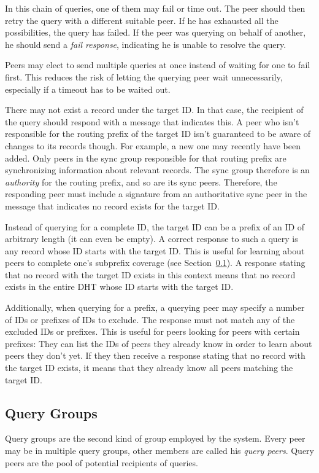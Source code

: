 In this chain of queries, one of them may fail or time out. The peer should then
retry the query with a different suitable peer. If he has exhausted all the
possibilities, the query has failed. If the peer was querying on behalf of
another, he should send a \emph{fail response}, indicating he is unable to
resolve the query.

Peers may elect to send multiple queries at once instead of waiting for one to
fail first. This reduces the risk of letting the querying peer wait
unnecessarily, especially if a timeout has to be waited out.

There may not exist a record under the target ID. In that case, the recipient of
the query should respond with a message that indicates this. A peer who isn't
responsible for the routing prefix of the target ID isn't guaranteed to be aware
of changes to its records though. For example, a new one may recently have been
added. Only peers in the sync group responsible for that routing prefix are
synchronizing information about relevant records. The sync group therefore is an
\emph{authority} for the routing prefix, and so are its sync peers. Therefore,
the responding peer must include a signature from an authoritative sync peer in
the message that indicates no record exists for the target ID.

Instead of querying for a complete ID, the target ID can be a prefix of an ID of
arbitrary length (it can even be empty). A correct response to such a query is
any record whose ID starts with the target ID. This is useful for learning about
peers to complete one's subprefix coverage (see
Section~\ref{sec:desc_query_groups}). A response stating that no record with the
target ID exists in this context means that no record exists in the entire
\ac{DHT} whose ID starts with the target ID.

Additionally, when querying for a prefix, a querying peer may specify a number
of IDs or prefixes of IDs to exclude. The response must not match any of the
excluded IDs or prefixes. This is useful for peers looking for peers with
certain prefixes: They can list the IDs of peers they already know in order to
learn about peers they don't yet. If they then receive a response stating that
no record with the target ID exists, it means that they already know all peers
matching the target ID.

\subsection{Query Groups}
\label{sec:desc_query_groups}
Query groups are the second kind of group employed by the system. Every peer may
be in multiple query groups, other members are called his \emph{query peers}.
Query peers are the pool of potential recipients of queries.

